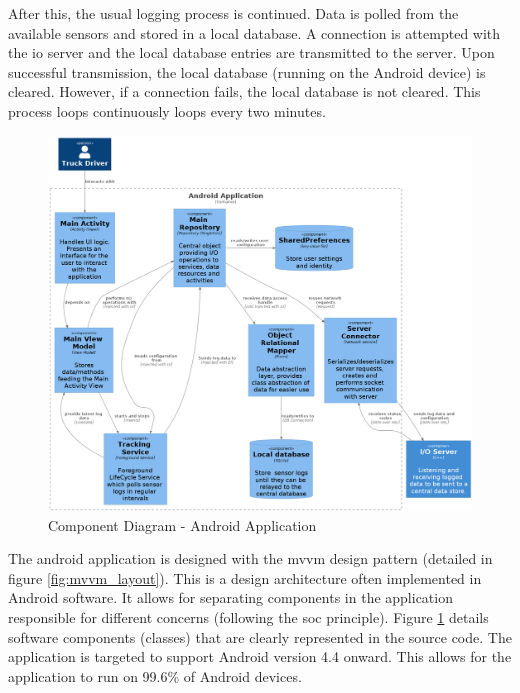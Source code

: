 After this, the usual logging process is continued.
Data is polled from the available sensors and stored in a local database.
A connection is attempted with the \ac{io} server and the local database entries are transmitted to the server.
Upon successful transmission, the local database (running on the Android device) is cleared.
However, if a connection fails, the local database is not cleared.
This process loops continuously loops every two minutes.
 
\begin{figure}
\centering
\includegraphics[width=6in]{../diag/android_component.png}
\caption{Component Diagram - Android Application}
\label{fig:android_component}
\end{figure}

The android application is designed with the \ac{mvvm} design pattern (detailed in figure \ref{fig:mvvm_layout}).
This is a design architecture often implemented in Android software.
It allows for separating components in the application responsible for different concerns (following the \ac{soc} principle).
Figure \ref{fig:android_component} details software components (classes) that are clearly represented in the source code.
The application is targeted to support Android version 4.4 onward.
This allows for the application to run on 99.6\% of Android devices.

